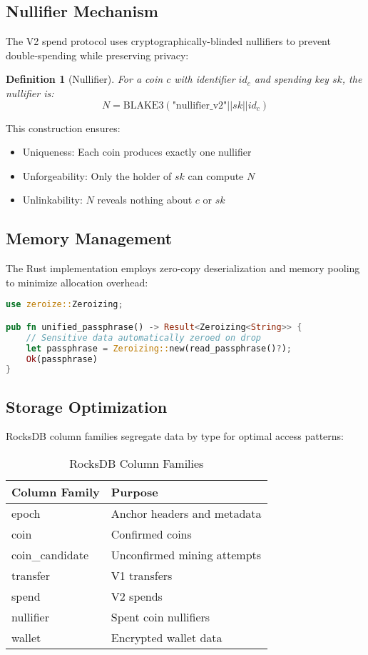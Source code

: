 \documentclass[12pt,a4paper]{article}
\newtheorem{definition}{Definition}
\begin{document}
\subsection{Nullifier Mechanism}

The V2 spend protocol uses cryptographically-blinded nullifiers to prevent double-spending while preserving privacy:

\begin{definition}[Nullifier]
For a coin $c$ with identifier $id_c$ and spending key $sk$, the nullifier is:
$$N = \text{BLAKE3}(\text{"nullifier\_v2"} || sk || id_c)$$
\end{definition}

This construction ensures:
\begin{itemize}
\item Uniqueness: Each coin produces exactly one nullifier
\item Unforgeability: Only the holder of $sk$ can compute $N$
\item Unlinkability: $N$ reveals nothing about $c$ or $sk$
\end{itemize}

\subsection{Memory Management}

The Rust implementation employs zero-copy deserialization and memory pooling to minimize allocation overhead:

\begin{lstlisting}[language=Rust]
use zeroize::Zeroizing;

pub fn unified_passphrase() -> Result<Zeroizing<String>> {
    // Sensitive data automatically zeroed on drop
    let passphrase = Zeroizing::new(read_passphrase()?);
    Ok(passphrase)
}
\end{lstlisting}

\subsection{Storage Optimization}

RocksDB column families segregate data by type for optimal access patterns:

\begin{table}[h]
\centering
\begin{tabular}{@{}ll@{}}
\toprule
\textbf{Column Family} & \textbf{Purpose} \\ \midrule
epoch & Anchor headers and metadata \\
coin & Confirmed coins \\
coin\_candidate & Unconfirmed mining attempts \\
transfer & V1 transfers \\
spend & V2 spends \\
nullifier & Spent coin nullifiers \\
wallet & Encrypted wallet data \\
\bottomrule
\end{tabular}
\caption{RocksDB Column Families}
\end{table}
\end{document}
